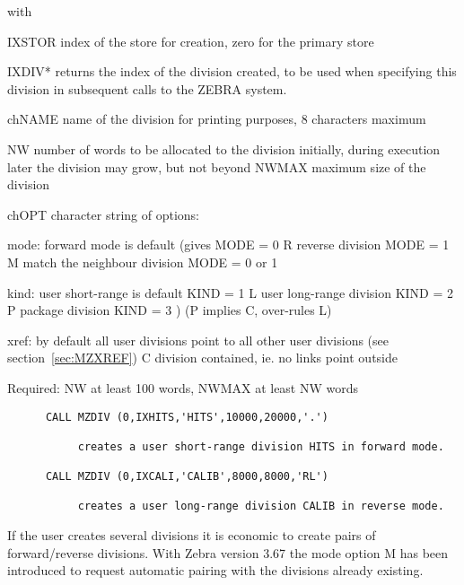 with
\begin{XMP}
      IXSTOR  index of the store for creation,
              zero for the primary store

      IXDIV*  returns the index of the division created,
              to be used when specifying this division
              in subsequent calls to the ZEBRA system.

      chNAME  name of the division for printing purposes,
              8 characters maximum

          NW  number of words to be allocated to the division initially,
              during execution later the division may grow, but not beyond
       NWMAX  maximum size of the division

       chOPT  character string of options:

             mode:      forward mode is default    (gives MODE = 0
                     R  reverse division                  MODE = 1
                     M  match the neighbour division      MODE = 0 or 1

             kind:      user short-range is default       KIND = 1
                     L  user long-range division          KIND = 2
                     P  package division                  KIND = 3 )
                        (P implies C, over-rules L)

             xref:      by default all user divisions point to all other
                                   user divisions (see section~\ref{sec:MZXREF})
                     C  division contained, ie. no links point outside

Required:     NW at least 100 words,  NWMAX at least NW words

\end{XMP}

\Examples

\begin{verbatim}
      CALL MZDIV (0,IXHITS,'HITS',10000,20000,'.')

           creates a user short-range division HITS in forward mode.

      CALL MZDIV (0,IXCALI,'CALIB',8000,8000,'RL')

           creates a user long-range division CALIB in reverse mode.
\end{verbatim} 

If the user creates several divisions it is economic to create
pairs of forward/reverse divisions.
With Zebra version 3.67 the mode option M has been introduced
to request automatic pairing with the divisions already existing.

